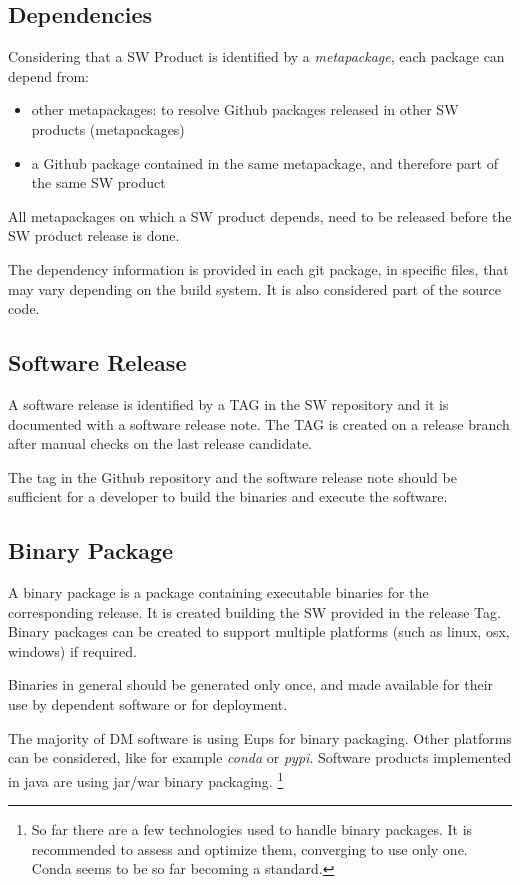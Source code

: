 \subsection{Dependencies} \label{sect:dependencies}

Considering that a SW Product is identified by a \textit{metapackage}, each package can depend from:

\begin{itemize}
\item other metapackages: to resolve Github packages released in other SW products (metapackages)
\item a Github package contained in the same metapackage, and therefore part of the same SW product
\end{itemize}

All metapackages on which a SW product depends, need to be released before the SW product release is done.

The dependency information is provided in each git package, in specific files, that may vary depending on the build system.
It is also considered part of the source code.


\subsection{Software Release} \label{sect:swrel}

A software release is identified by a TAG in the SW repository and it is documented with a software release note.
The TAG is created on a release branch after manual checks on the last release candidate.

The tag in the Github repository and the software release note should be sufficient for a developer 
to build the binaries and execute the software.


\subsection{Binary Package} \label{sect:swbpkg}

A binary package is a package containing executable binaries for the corresponding release.
It is created building the SW provided in the release Tag. 
Binary packages can be created to support multiple platforms (such as linux, osx, windows) if required.

Binaries in general should be generated only once, and made available for their use by dependent software or for deployment.

The majority of DM software is using Eups for binary packaging. Other platforms can be considered, like for example \textit{conda} or \textit{pypi}.
Software products implemented in java are using jar/war binary packaging.
\footnote{So far there are a few technologies used to handle binary packages. It is recommended to assess and optimize them, converging to use only one. 
Conda seems to be so far becoming a standard.}


